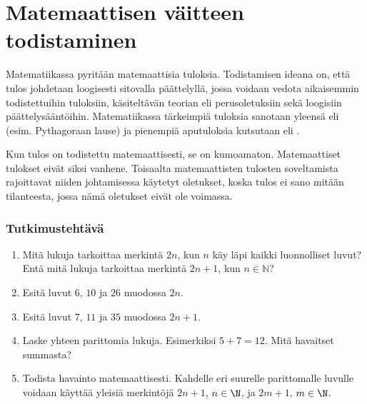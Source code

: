 \chapter{Matemaattisen väitteen todistaminen}

Matematiikassa pyritään  matemaattisia tuloksia.
Todistamisen ideana on, että tulos johdetaan loogisesti sitovalla päättelyllä,
jossa voidaan vedota aikaisemmin todistettuihin tuloksiin,
käsiteltävän teorian  eli perusoletuksiin sekä loogisiin päättelysääntöihin.
Matematiikassa tärkeimpiä tuloksia sanotaan yleensä  eli
 (esim. Pythagoraan lause) ja pienempiä aputuloksia kutsutaan
 eli .

Kun tulos on todistettu matemaattisesti, se on kumoamaton. Matemaattiset tulokset eivät siksi vanhene.
Toisaalta matemaattisten tulosten soveltamista rajoittavat niiden johtamisessa käytetyt oletukset,
koska tulos ei sano mitään tilanteesta, jossa nämä oletukset eivät ole voimassa.

\subsection*{Tutkimustehtävä} %

\begin{enumerate}
	\item Mitä lukuja tarkoittaa merkintä $2n$, kun $n$ käy läpi kaikki luonnolliset luvut? Entä mitä lukuja 
		tarkoittaa merkintä $2n + 1$, kun $n\in \mathbb{N}$?
	\item %
		Esitä luvut $6$, $10$ ja $26$ muodossa $2n$.
	\item %
		Esitä luvut $7$, $11$ ja $35$ muodossa $2n+1$.
	\item Laske yhteen parittomia lukuja. Esimerkiksi $5 + 7 = 12$. Mitä havaitset summasta?
	\item Todista havainto matemaattisesti. Kahdelle eri suurelle parittomalle luvulle voidaan käyttää yleisiä 
		merkintöjä $2n + 1$, $n \in\N$, ja $2m + 1$, $m \in\N$.
\end{enumerate}

